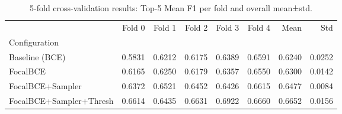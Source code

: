\begin{table}
\caption{5-fold cross-validation results: Top-5 Mean F1 per fold and overall mean±std.}
\label{tab:crossval}
\begin{tabular}{lrrrrrrr}
\toprule
 & Fold 0 & Fold 1 & Fold 2 & Fold 3 & Fold 4 & Mean & Std \\
Configuration &  &  &  &  &  &  &  \\
\midrule
Baseline (BCE) & 0.5831 & 0.6212 & 0.6175 & 0.6389 & 0.6591 & 0.6240 & 0.0252 \\
FocalBCE & 0.6165 & 0.6250 & 0.6179 & 0.6357 & 0.6550 & 0.6300 & 0.0142 \\
FocalBCE+Sampler & 0.6372 & 0.6521 & 0.6452 & 0.6426 & 0.6615 & 0.6477 & 0.0084 \\
FocalBCE+Sampler+Thresh & 0.6614 & 0.6435 & 0.6631 & 0.6922 & 0.6660 & 0.6652 & 0.0156 \\
\bottomrule
\end{tabular}
\end{table}
